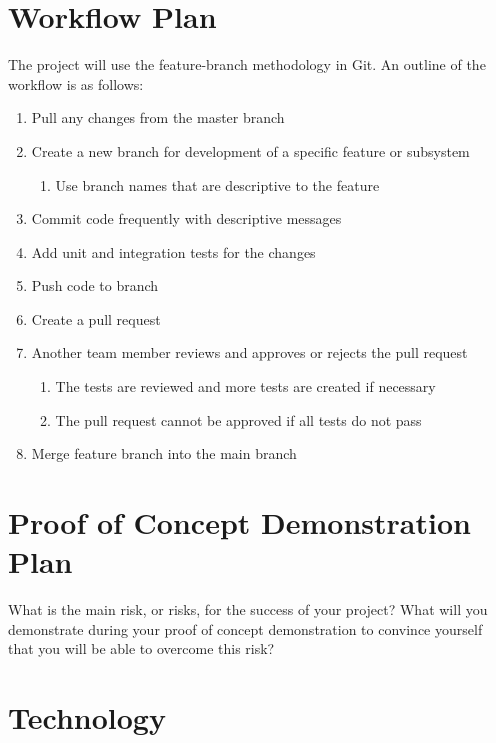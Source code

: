 \documentclass{article}
\begin{document}
\section{Workflow Plan}
{The project will use the feature-branch methodology in Git. An outline of the workflow is as follows:}
\begin{enumerate}
    \item Pull any changes from the master branch
    \item Create a new branch for development of a specific feature or subsystem
        \begin{enumerate}
            \item Use branch names that are descriptive to the feature
        \end{enumerate}
    \item Commit code frequently with descriptive messages
    \item Add unit and integration tests for the changes
    \item Push code to branch
    \item Create a pull request
    \item Another team member reviews and approves or rejects the pull request
        \begin{enumerate}
            \item The tests are reviewed and more tests are created if necessary
            \item The pull request cannot be approved if all tests do not pass
        \end{enumerate}
    \item Merge feature branch into the main branch
\end{enumerate}

\section{Proof of Concept Demonstration Plan}

What is the main risk, or risks, for the success of your project?  What will you
demonstrate during your proof of concept demonstration to convince yourself that
you will be able to overcome this risk?

\section{Technology}
\end{document}
